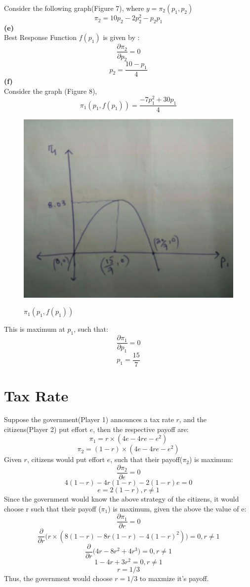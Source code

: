 \documentclass{article}
\begin{document}
Consider the following graph(Figure 7), where $y = \pi_2(p_1,p_2)$ 
$$\pi_2 = 10p_2 - 2p_2^2 - p_2p_1$$
\textbf{(e)} \\
Best Response Function $f(p_1)$ is given by :
$$\frac{\partial \pi_2}{\partial p_2}= 0$$
$$p_2 = \frac{10-p_1}{4}$$
\textbf{(f)} \\
Consider the graph (Figure 8), 
$$\pi_1(p_1, f(p_1)) = \frac{-7p_1^2+30p_1}{4}$$
\begin{figure}[h!]
\begin{center}
\includegraphics[scale=0.1]{quad2.png}
\label{qu2}
\caption{$\pi_1(p_1, f(p_1))$}
\end{center}
\end{figure}
This is maximum at $p_1$, such that:
$$\frac{\partial \pi_1}{\partial p_1}= 0$$
$$p_1 = \frac{15}{7}$$
\section{Tax Rate}
Suppose the government(Player 1) announces a tax rate $r$, and the citizens(Player 2) put effort $e$, then the respective payoff are:
$$ \pi_1 = r \times (4e - 4re - e^2)$$
$$ \pi_2 = (1-r) \times (4e - 4re - e^2)$$
Given $r$, citizens would put effort $e$, such that their payoff($\pi_2$) is maximum:
$$\frac{\partial \pi_2}{\partial e}= 0$$
$$ 4(1-r)- 4r(1-r) - 2(1-r)e = 0$$
$$e = 2(1- r), r \neq 1$$
Since the government would know the above strategy of the citizens, it would choose r such that their payoff ($\pi_1$) is maximum, given the above the value of e:
$$\frac{\partial \pi_1}{\partial r}= 0$$
$$\frac{\partial}{\partial r}\Big(r \times (8(1-r) - 8r(1-r) - 4(1-r)^2)\Big)= 0,r \neq 1$$
$$\frac{\partial}{\partial r}\Big(4r - 8r^2+4r^3\Big)= 0,r \neq 1$$
$$1 - 4r + 3r^2 = 0,r \neq 1$$
$$r = 1/3$$
Thus, the government would choose $r=1/3$ to maxmize it's payoff.
\end{document}
